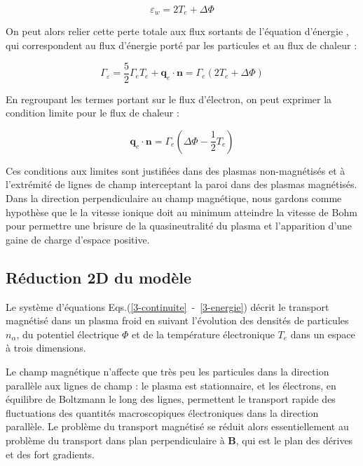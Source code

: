 \begin{refsection}
\begin{equation}
	\varepsilon_w=2T_e+\Delta \Phi
\end{equation}
 
 On peut alors relier cette perte totale aux flux sortants de l'équation
 d'énergie , qui correspondent au flux d'énergie porté par
 les particules et au flux de chaleur :
 
\begin{equation}
\Gamma_\varepsilon=\frac{5}{2}{\Gamma}_eT_e+\mathbf{q}_e\cdot\mathbf{n}=
\Gamma_e\left(2T_e+\Delta \Phi\right)
\end{equation}

En regroupant les termes portant sur le flux d'électron, on peut exprimer la
condition limite pour le flux de chaleur :

\begin{equation}
\mathbf{q}_e\cdot\mathbf{n}=\Gamma_e\left(\Delta \Phi-\frac{1}{2}T_e\right)
\end{equation}

Ces conditions aux limites sont justifiées dans des plasmas non-magnétisés et à
l'extrémité de lignes de champ interceptant la paroi dans
des plasmas magnétisés. Dans la direction perpendiculaire au champ magnétique,
nous gardons comme hypothèse que le la vitesse ionique doit au
minimum atteindre la vitesse de Bohm pour permettre une brisure de
la quasineutralité du plasma et l'apparition d'une gaine de charge d'espace
positive.

\subsection{Réduction 2D du modèle}
Le système d'équations Eqs.(\ref{3-continuite}~-~\ref{3-energie}) décrit le
transport magnétisé dans un plasma froid en suivant l'évolution des densités de
particules $n_\alpha$, du potentiel électrique $\Phi$ et de la température
électronique $T_e$ dans un espace à trois dimensions. 

Le champ magnétique n'affecte que très peu les particules dans la direction
parallèle aux lignes de champ : le plasma est stationnaire, et les électrons, en
équilibre de Boltzmann le long des lignes, permettent le transport rapide des fluctuations des quantités
macroscopiques électroniques dans la direction parallèle. Le problème du
transport magnétisé se réduit alors essentiellement au problème du transport
dans plan perpendiculaire à $\mathbf B$, qui est le plan des dérives et des
fort gradients.


\end{refsection}

